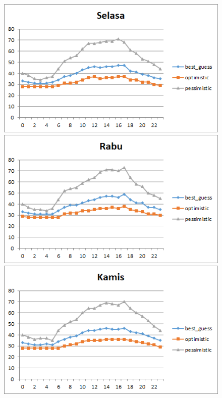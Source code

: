 \begin{figure}[H]
				\centering		
				\includegraphics[]{Gambar/selasasampel117072017reverse.png}
				\includegraphics[]{Gambar/rabusampel117072017reverse.png}
				\includegraphics[]{Gambar/kamissampel117072017reverse.png}
\end{figure}			
			
